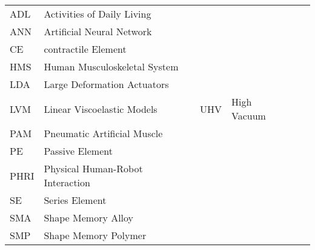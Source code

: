 \begin{abbreviations}


\begin{table}[h]
\centering
\small{
\begin{tabular}{lp{5cm}llp{5cm}ll}
ADL     & Activities of Daily Living &       &    &  \\
ANN     & Artificial Neural Network &       &     &  \\
CE      & contractile Element &      &    &     \\       
HMS     & Human Musculoskeletal System &      &    &     \\       
LDA     & Large Deformation Actuators &      &    &     \\       
LVM     & Linear Viscoelastic Models &      & UHV   &  High Vacuum \\
PAM     & Pneumatic Artificial Muscle & & & \\
PE      & Passive Element & & & \\
PHRI    & Physical Human-Robot Interaction & & & \\
SE      & Series Element & & & \\
SMA     & Shape Memory Alloy & & & \\
SMP     & Shape Memory Polymer & & & \\
\end{tabular}
}
\label{tbl:Abbreviations}
\end{table}


\end{abbreviations}
